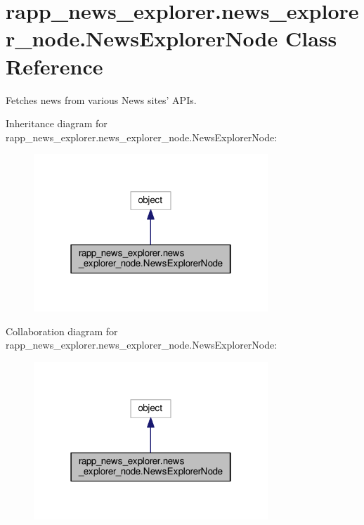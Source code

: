 \hypertarget{classrapp__news__explorer_1_1news__explorer__node_1_1NewsExplorerNode}{\section{rapp\-\_\-news\-\_\-explorer.\-news\-\_\-explorer\-\_\-node.\-News\-Explorer\-Node Class Reference}
\label{classrapp__news__explorer_1_1news__explorer__node_1_1NewsExplorerNode}
}


Fetches news from various News sites' A\-P\-Is.  




Inheritance diagram for rapp\-\_\-news\-\_\-explorer.\-news\-\_\-explorer\-\_\-node.\-News\-Explorer\-Node\-:
\nopagebreak
\begin{figure}[H]
\begin{center}
\leavevmode
\includegraphics[width=250pt]{classrapp__news__explorer_1_1news__explorer__node_1_1NewsExplorerNode__inherit__graph}
\end{center}
\end{figure}


Collaboration diagram for rapp\-\_\-news\-\_\-explorer.\-news\-\_\-explorer\-\_\-node.\-News\-Explorer\-Node\-:
\nopagebreak
\begin{figure}[H]
\begin{center}
\leavevmode
\includegraphics[width=250pt]{classrapp__news__explorer_1_1news__explorer__node_1_1NewsExplorerNode__coll__graph}
\end{center}
\end{figure}
